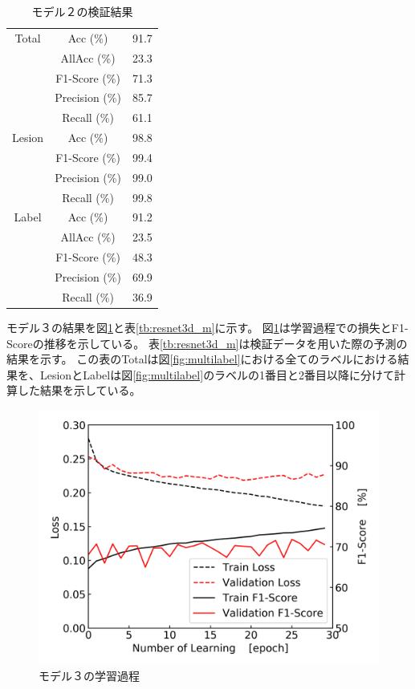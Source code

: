 \begin{table}[tb]
    \caption[]{モデル２の検証結果}
    \label{tb:resnet3d_e}
    \centering
    \normalsize
    \begin{tabular}{c|c|r} \hline
        Total & Acc (\%) & 91.7 \\ \cline{2-3}
         & AllAcc (\%) & 23.3 \\ \cline{2-3}
         & F1-Score (\%) & 71.3 \\ \cline{2-3}
         & Precision (\%) & 85.7 \\ \cline{2-3}
         & Recall (\%) & 61.1 \\ \hline
        Lesion & Acc (\%) & 98.8 \\ \cline{2-3}
         & F1-Score (\%) & 99.4 \\ \cline{2-3}
         & Precision (\%) & 99.0 \\ \cline{2-3}
         & Recall (\%) & 99.8 \\ \hline
        Label & Acc (\%) & 91.2 \\ \cline{2-3}
         & AllAcc (\%) & 23.5 \\ \cline{2-3}
         & F1-Score (\%) & 48.3 \\ \cline{2-3}
         & Precision (\%) & 69.9 \\ \cline{2-3}
         & Recall (\%) & 36.9 \\ \hline
    \end{tabular}
\end{table}

\newpage
モデル３の結果を図\ref{fig:resnet3d_m_result_process}と表\ref{tb:resnet3d_m}に示す。
図\ref{fig:resnet3d_m_result_process}は学習過程での損失とF1-Scoreの推移を示している。
表\ref{tb:resnet3d_m}は検証データを用いた際の予測の結果を示す。
この表のTotalは図\ref{fig:multilabel}における全てのラベルにおける結果を、LesionとLabelは図\ref{fig:multilabel}のラベルの1番目と2番目以降に分けて計算した結果を示している。

\begin{figure}[htbp]
    \begin{center}
        \includegraphics[width=150mm]{./fig/resnet3d_mprocess.png}
        \caption{モデル３の学習過程}
        \label{fig:resnet3d_m_result_process}
    \end{center}
\end{figure}

